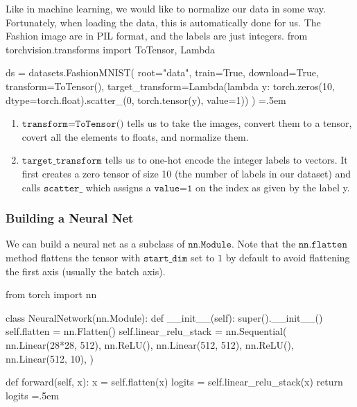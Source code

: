 \documentclass{article}
\newenvironment{cverbatim}
    {\SaveVerbatim{cverb}}
    {\endSaveVerbatim
      \flushleft\fboxrule=0pt\fboxsep=.5em
      \colorbox{cverbbg}{%
        \makebox[\dimexpr\linewidth-2\fboxsep][l]{\BUseVerbatim{cverb}}%
      }
      \endflushleft
  }
\theoremstyle{definition}
\theoremstyle{remark}
\theoremstyle{definition}
\begin{document}
      Like in machine learning, we would like to normalize our data in some way. Fortunately, when loading the data, this is automatically done for us. The Fashion image are in PIL format, and the labels are just integers. 
      \begin{cverbatim}
      from torchvision.transforms import ToTensor, Lambda

      ds = datasets.FashionMNIST(
          root="data",
          train=True,
          download=True,
          transform=ToTensor(),
          target_transform=Lambda(lambda y: torch.zeros(10, dtype=torch.float).scatter_(0, 
              torch.tensor(y), value=1))
      )
      \end{cverbatim}
      \begin{enumerate}
          \item $\texttt{transform=ToTensor()}$ tells us to take the images, convert them to a tensor, covert all the elements to floats, and normalize them. 
          \item $\texttt{target\_transform}$ tells us to one-hot encode the integer labels to vectors. It first creates a zero tensor of size 10 (the number of labels in our dataset) and calls $\texttt{scatter\_}$ which assigns a $\texttt{value=1}$ on the index as given by the label y.
      \end{enumerate}

    \subsubsection{Building a Neural Net}

      We can build a neural net as a subclass of $\texttt{nn.Module}$. Note that the $\texttt{nn.flatten}$ method flattens the tensor with $\texttt{start\_dim}$ set to $1$ by default to avoid flattening the first axis (usually the batch axis). 

      \begin{cverbatim}
        from torch import nn

        class NeuralNetwork(nn.Module):
          def __init__(self):
            super().__init__()
            self.flatten = nn.Flatten()
            self.linear_relu_stack = nn.Sequential(
              nn.Linear(28*28, 512),
              nn.ReLU(),
              nn.Linear(512, 512),
              nn.ReLU(),
              nn.Linear(512, 10),
            )

          def forward(self, x):
            x = self.flatten(x)
            logits = self.linear_relu_stack(x)
            return logits
      \end{cverbatim}
\end{document}
